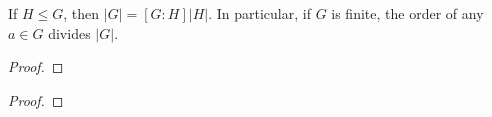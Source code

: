 \documentclass[11pt,a4paper]{article}
\begin{document}
\begin{cor}
    If \( H \leq G \), then \( |G| = [G : H] |H| \). 
In particular, if \( G \) is finite, the order of  any \( a \in G \) divides \( |G| \).
\end{cor}

\begin{proof}
    
\end{proof}


\begin{teo}
    
\end{teo}


\begin{prop}
    
\end{prop}

\begin{proof}
    
\end{proof}


\begin{prop}
    
\end{prop}
\end{document}

